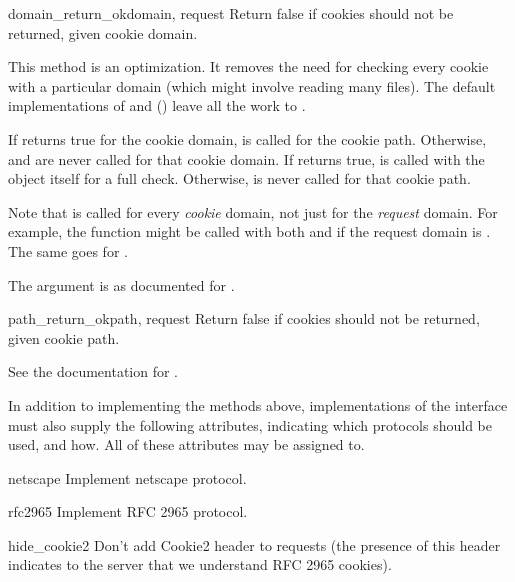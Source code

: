 \begin{methoddesc}[CookiePolicy]{domain_return_ok}{domain, request}
Return false if cookies should not be returned, given cookie domain.

This method is an optimization.  It removes the need for checking
every cookie with a particular domain (which might involve reading
many files).  The default implementations of
 and 
() leave all the work to .

If  returns true for the cookie domain,
 is called for the cookie path.  Otherwise,
 and  are never called
for that cookie domain.  If  returns true,
 is called with the  object itself
for a full check.  Otherwise,  is never called for
that cookie path.

Note that  is called for every
\emph{cookie} domain, not just for the \emph{request} domain.  For
example, the function might be called with both 
and  if the request domain is
.  The same goes for
.

The  argument is as documented for .
\end{methoddesc}

\begin{methoddesc}[CookiePolicy]{path_return_ok}{path, request}
Return false if cookies should not be returned, given cookie path.

See the documentation for .
\end{methoddesc}


In addition to implementing the methods above, implementations of the
 interface must also supply the following
attributes, indicating which protocols should be used, and how.  All
of these attributes may be assigned to.

\begin{memberdesc}{netscape}
Implement netscape protocol.
\end{memberdesc}
\begin{memberdesc}{rfc2965}
Implement RFC 2965 protocol.
\end{memberdesc}
\begin{memberdesc}{hide_cookie2}
Don't add Cookie2 header to requests (the presence of this header
indicates to the server that we understand RFC 2965 cookies).
\end{memberdesc}

